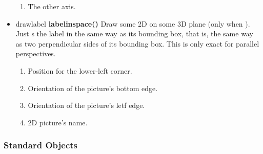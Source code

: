 \begin{itemize}
\begin{enumerate}
\item {} The other axis.
\end{enumerate}
\item drawlabel {\bfseries labelinspace()} Draw some 2D
 on some 3D plane (only when
). Just s the
  label in the same
  way as its bounding box, that is, the same way as two perpendicular sides
  of its bounding box. This is only exact for parallel perspectives.
\begin{enumerate}
\item {} Position for the lower-left
corner. 
\item {} Orientation of the picture's
bottom edge.
\item {} Orientation of the picture's
letf edge.
\item {} 2D picture's name.
\end{enumerate}

\end{itemize}


\subsubsection{Standard Objects}

